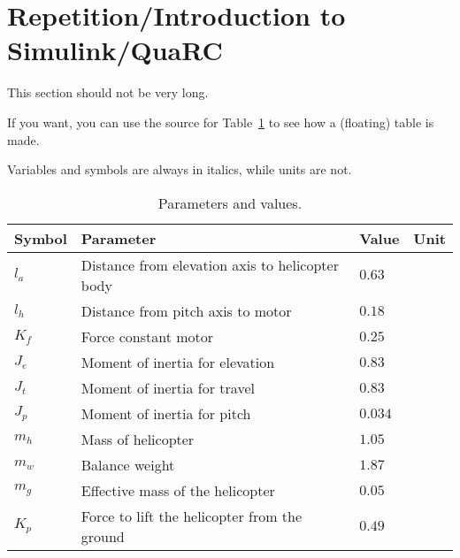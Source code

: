 \section{Repetition/Introduction to Simulink/QuaRC}\label{sec:prob1}
This section should not be very long.

If you want, you can use the source for Table~\ref{tab:parameters} to see how a (floating) table is made. 

Variables and symbols are always in italics, while units are not.

\begin{table}[tbp]
	\centering
	\caption{Parameters and values.}
	\begin{tabular}{llll}
		\hline
		Symbol & Parameter & Value & Unit \\
		\hline
		$l_a$ & Distance from elevation axis to helicopter body & $0.63$ & \meter \\
		$l_h$ & Distance from pitch axis to motor & $0.18$ & \meter \\
		$K_f$ & Force constant motor & $0.25$ & \newton\per\volt \\
		$J_e$ & Moment of inertia for elevation & $0.83$ & \kilogram\usk\square\meter \\
		$J_t$ & Moment of inertia for travel & $0.83$ & \kilogram\usk\square\meter \\
		$J_p$ & Moment of inertia for pitch & $0.034$ & \kilogram\usk\square\meter \\
		$m_h$ & Mass of helicopter & $1.05$ & \kilogram \\
		$m_w$ & Balance weight & $1.87$ & \kilogram \\
		$m_g$ & Effective mass of the helicopter & $0.05$ & \kilogram \\
		$K_p$ & Force to lift the helicopter from the ground & $0.49$ & \newton \\
		\hline
	\end{tabular}
	\label{tab:parameters}
\end{table}